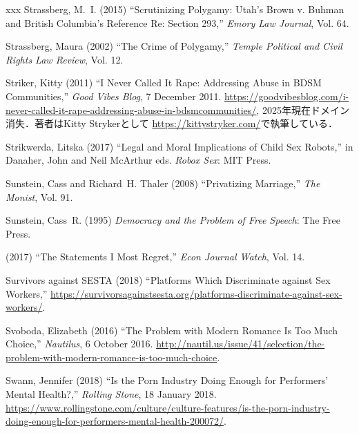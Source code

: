 \documentclass[]{jlreq} \usepackage{mystyle}
\begin{document}
\begin{thebibliography}{xxx}
Strassberg, M.~I. (2015) ``Scrutinizing Polygamy: Utah's Brown v. Buhman and
  British Columbia's Reference Re: Section 293,'' \textit{ Emory Law Journal},
  Vol. 64.

Strassberg, Maura (2002) ``The Crime of Polygamy,'' \textit{ Temple Political
  and Civil Rights Law Review}, Vol. 12.

Striker, Kitty (2011) ``I Never Called It Rape: Addressing Abuse in BDSM
  Communities,'' \emph{Good Vibes Blog}, 7 December 2011.
  \url{https://goodvibesblog.com/i-never-called-it-rape-addressing-abuse-in-bdsmcommunities/},
  2025年現在ドメイン消失．著者はKitty
  Strykerとして \url{https://kittystryker.com/}で執筆している．

Strikwerda, Litska (2017) ``Legal and Moral Implications of Child Sex Robots,''
  in Danaher, John and Neil McArthur eds.   \textit{ Robox Sex}: MIT Press.

Sunstein, Cass and Richard~H. Thaler (2008) ``Privatizing Marriage,'' \textit{
  The Monist}, Vol. 91.

Sunstein, Cass~R. (1995)  \textit{ Democracy and the Problem of Free Speech}:
  The Free Press.

 \bysame{}  (2017) ``The Statements I Most Regret,'' \textit{ Econ Journal
  Watch}, Vol. 14.

{Survivors against SESTA} (2018) ``Platforms Which Discriminate against Sex
  Workers,''
  \url{https://survivorsagainstsesta.org/platforms-discriminate-against-sex-workers/}.

Svoboda, Elizabeth (2016) ``The Problem with Modern Romance Is Too Much
  Choice,'' \emph{Nautilus}, 6 October 2016.
  \url{http://nautil.us/issue/41/selection/the-problem-with-modern-romance-is-too-much-choice}.

Swann, Jennifer (2018) ``Is the Porn Industry Doing Enough for Performers'
  Mental Health?,'' \emph{Rolling Stone}, 18 January 2018.
  \url{https://www.rollingstone.com/culture/culture-features/is-the-porn-industry-doing-enough-for-performers-mental-health-200072/}.


\end{thebibliography}
\end{document}

